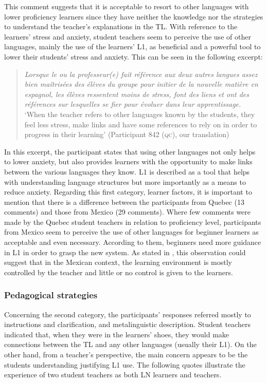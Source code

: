 \documentclass[output=paper]{../langscibook}
\begin{document}
This comment suggests that it is acceptable to resort to other languages with lower proficiency learners since they have neither the knowledge nor the strategies to understand the teacher’s explanations in the TL. With reference to the learners’ stress and anxiety, student teachers seem to perceive the use of other languages, mainly the use of the learners’ L1, as beneficial and a powerful tool to lower their students’ stress and anxiety. This can be seen in the following excerpt: 

\begin{quote}
\emph{Lorsque le ou la professeur(e) fait référence aux deux autres langues assez bien maîtrisées des élèves du groupe pour initier de la nouvelle matière en espagnol, les élèves ressentent moins de stress, font des liens et ont des références sur lesquelles se fier pour évoluer dans leur apprentissage.}\smallskip\\
`When the teacher refers to other languages known by the students, they feel less stress, make links and have some references to rely on in order to progress in their learning' (Participant 842 (\textsc{qc}), our translation)
\end{quote}

In this excerpt, the participant states that using other languages not only helps to lower anxiety, but also provides learners with the opportunity to make links between the various languages they know. L1 is described as a tool that helps with understanding language structures but more importantly as a means to reduce anxiety. Regarding this first category, learner factors, it is important to mention that there is a difference between the participants from Quebec (13 comments) and those from Mexico (29 comments). Where few comments were made by the Quebec student teachers in relation to proficiency level, participants from Mexico seem to perceive the use of other languages for beginner learners as acceptable and even necessary. According to them, beginners need more guidance in L1 in order to grasp the new system. As stated in  \citet{MoraPabloEtAl2011}, this observation could suggest that in the Mexican context, the learning environment is mostly controlled by the teacher and little or no control is given to the learners.


\subsubsection{Pedagogical strategies}


Concerning the second category, the participants’ responses referred mostly to instructions and clarification, and metalinguistic description. Student teachers indicated that, when they were in the learners’ shoes, they would make connections between the TL and any other languages (usually their L1). On the other hand, from a teacher’s perspective, the main concern appears to be the students understanding justifying L1 use. The following quotes illustrate the experience of two student teachers as both LN learners and teachers. 
\end{document}
